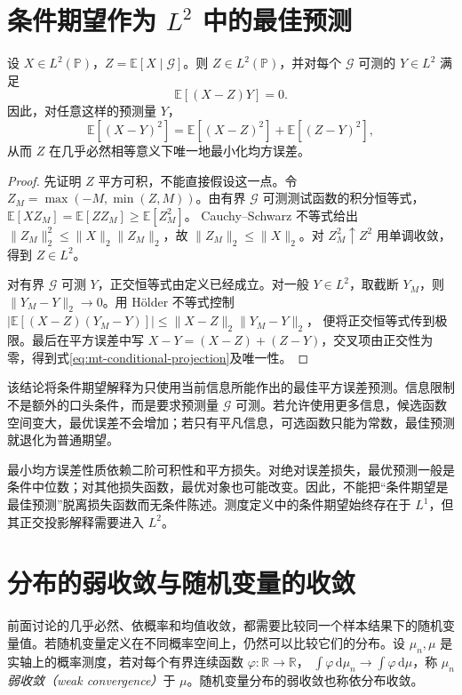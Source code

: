 \section{条件期望作为 $L^2$ 中的最佳预测}
\begin{theorem}
设 $X\in L^2(\mathbb P)$，$Z=\mathbb E[X\mid\mathcal G]$。则 $Z\in L^2(\mathbb P)$，并对每个 $\mathcal G$ 可测的 $Y\in L^2$ 满足
\[
 \mathbb E[(X-Z)Y]=0.
\]
因此，对任意这样的预测量 $Y$，
\begin{equation}
 \mathbb E[(X-Y)^2]
 =\mathbb E[(X-Z)^2]+\mathbb E[(Z-Y)^2],
 \label{eq:mt-conditional-projection}
\end{equation}
从而 $Z$ 在几乎必然相等意义下唯一地最小化均方误差。
\label{thm:mt-conditional-projection}
\end{theorem}
\begin{proof}
先证明 $Z$ 平方可积，不能直接假设这一点。令 $Z_M=\max(-M,\min(Z,M))$。由有界 $\mathcal G$ 可测测试函数的积分恒等式，
$\mathbb E[XZ_M]=\mathbb E[ZZ_M]\geq\mathbb E[Z_M^2]$。
Cauchy--Schwarz 不等式给出
$\|Z_M\|_2^2\leq\|X\|_2\|Z_M\|_2$，故 $\|Z_M\|_2\leq\|X\|_2$。对 $Z_M^2\uparrow Z^2$ 用单调收敛，得到 $Z\in L^2$。

对有界 $\mathcal G$ 可测 $Y$，正交恒等式由定义已经成立。对一般 $Y\in L^2$，取截断 $Y_M$，则 $\|Y_M-Y\|_2\to0$。用 Hölder 不等式控制
$|\mathbb E[(X-Z)(Y_M-Y)]|\leq\|X-Z\|_2\|Y_M-Y\|_2$，
便将正交恒等式传到极限。最后在平方误差中写 $X-Y=(X-Z)+(Z-Y)$，交叉项由正交性为零，得到式\eqref{eq:mt-conditional-projection}及唯一性。
\end{proof}

该结论将条件期望解释为只使用当前信息所能作出的最佳平方误差预测。信息限制不是额外的口头条件，而是要求预测量 $\mathcal G$ 可测。若允许使用更多信息，候选函数空间变大，最优误差不会增加；若只有平凡信息，可选函数只能为常数，最佳预测就退化为普通期望。

最小均方误差性质依赖二阶可积性和平方损失。对绝对误差损失，最优预测一般是条件中位数；对其他损失函数，最优对象也可能改变。因此，不能把“条件期望是最佳预测”脱离损失函数而无条件陈述。测度定义中的条件期望始终存在于 $L^1$，但其正交投影解释需要进入 $L^2$。

\section{分布的弱收敛与随机变量的收敛}
前面讨论的几乎必然、依概率和均值收敛，都需要比较同一个样本结果下的随机变量值。若随机变量定义在不同概率空间上，仍然可以比较它们的分布。设 $\mu_n,\mu$ 是实轴上的概率测度，若对每个有界连续函数 $\varphi:\mathbb R\to\mathbb R$，
$\int\varphi\,\mathrm d\mu_n\to\int\varphi\,\mathrm d\mu$，称 $\mu_n$ \emph{弱收敛（weak convergence）}于 $\mu$。随机变量分布的弱收敛也称依分布收敛。


